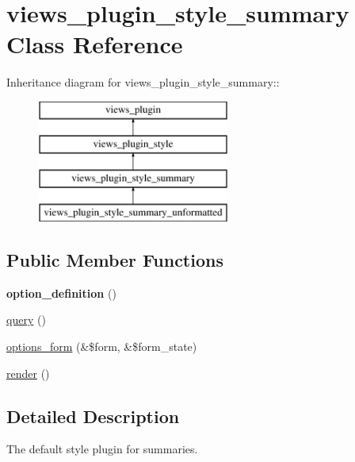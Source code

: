 \hypertarget{classviews__plugin__style__summary}{
\section{views\_\-plugin\_\-style\_\-summary Class Reference}
\label{classviews__plugin__style__summary}
}
Inheritance diagram for views\_\-plugin\_\-style\_\-summary::\begin{figure}[H]
\begin{center}
\leavevmode
\includegraphics[height=4cm]{classviews__plugin__style__summary}
\end{center}
\end{figure}
\subsection*{Public Member Functions}
\begin{DoxyCompactItemize}
\item 
\hypertarget{classviews__plugin__style__summary_a7b016dd1af2076e3cf3199cede83d953}{
{\bfseries option\_\-definition} ()}
\label{classviews__plugin__style__summary_a7b016dd1af2076e3cf3199cede83d953}

\item 
\hyperlink{classviews__plugin__style__summary_afd8f02a61bd0e1887cc7767950e8e0df}{query} ()
\item 
\hyperlink{classviews__plugin__style__summary_a43826183b4d54242ae5276f40f70475f}{options\_\-form} (\&\$form, \&\$form\_\-state)
\item 
\hyperlink{classviews__plugin__style__summary_a240be31b796b50331a25cf30818e584f}{render} ()
\end{DoxyCompactItemize}


\subsection{Detailed Description}
The default style plugin for summaries. 

